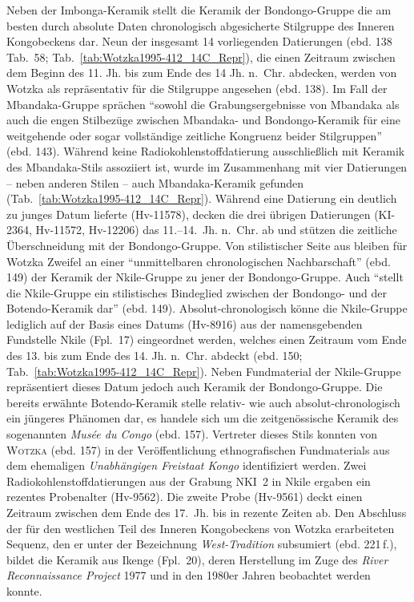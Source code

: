 Neben der Imbonga-Keramik stellt die Keramik der Bondongo-Gruppe die am besten durch absolute Daten chronologisch abgesicherte Stilgruppe des Inneren Kongobeckens dar. Neun der insgesamt 14 vorliegenden Datierungen (ebd. 138 Tab.~58; Tab.~\ref{tab:Wotzka1995-412_14C_Repr}), die einen Zeitraum zwischen dem Beginn des 11. Jh. bis zum Ende des 14 Jh. n.~Chr. abdecken, werden von Wotzka als repräsentativ für die Stilgruppe angesehen (ebd. 138). Im Fall der Mbandaka-Gruppe sprächen \enquote{sowohl die Grabungsergebnisse von Mbandaka als auch die engen Stilbezüge zwischen Mbandaka- und Bondongo-Keramik für eine weitgehende oder sogar vollständige zeitliche Kongruenz beider Stilgruppen} (ebd. 143). Während keine Radiokohlenstoffdatierung ausschließlich mit Keramik des Mbandaka-Stils assoziiert ist, wurde im Zusammenhang mit vier Datierungen -- neben anderen Stilen -- auch Mbandaka-Keramik gefunden (Tab.~\ref{tab:Wotzka1995-412_14C_Repr}). Während eine Datierung ein deutlich zu junges Datum lieferte (Hv-11578), decken die drei übrigen Datierungen (KI-2364, Hv-11572, Hv-12206) das 11.--14.~Jh. n.~Chr. ab und stützen die zeitliche Überschneidung mit der Bondongo-Gruppe. Von stilistischer Seite aus bleiben für Wotzka Zweifel an einer \enquote{unmittelbaren chronologischen Nachbarschaft} (ebd. 149) der Keramik der Nkile-Gruppe zu jener der Bondongo-Gruppe. Auch \enquote{stellt die Nkile-Gruppe ein stilistisches Bindeglied zwischen der Bondongo- und der Botendo-Keramik dar} (ebd. 149). Absolut-chronologisch könne die Nkile-Gruppe lediglich auf der Basis eines Datums (Hv-8916) aus der namensgebenden Fundstelle Nkile (Fpl.~17) eingeordnet werden, welches einen Zeitraum vom Ende des 13. bis zum Ende des 14. Jh. n.~Chr. abdeckt (ebd. 150; Tab.~\ref{tab:Wotzka1995-412_14C_Repr}). Neben Fundmaterial der Nkile-Gruppe repräsentiert dieses Datum jedoch auch Keramik der Bondongo-Gruppe. Die bereits erwähnte Botendo-Keramik stelle relativ- wie auch absolut-chronologisch ein jüngeres Phänomen dar, es handele sich um die zeitgenössische Keramik des sogenannten \textit{Musée du Congo} (ebd. 157). Vertreter dieses Stils konnten von \textsc{Wotzka} (ebd. 157) in der Veröffentlichung ethnografischen Fundmaterials aus dem ehemaligen \textit{Unabhängigen Freistaat Kongo} \parencite[155--157 Taf.~12]{Coart.1907} identifiziert werden. Zwei Radiokohlenstoffdatierungen aus der Grabung NKI~2 in Nkile \parencite[Fpl.~17; ][158 Tab.~70, 318--322 Kat.-Nr.~13; Tab.~\ref{tab:Wotzka1995-412_14C_Repr}]{Wotzka.1995} ergaben ein rezentes Probenalter (Hv-9562). Die zweite Probe (Hv-9561) deckt einen Zeitraum zwischen dem Ende des 17.~Jh. bis in rezente Zeiten ab. Den Abschluss der für den westlichen Teil des Inneren Kongobeckens von Wotzka erarbeiteten Sequenz, den er unter der Bezeichnung \textit{West-Tradition} subsumiert (ebd. 221\,f.), bildet die Keramik aus Ikenge (Fpl.~20), deren Herstellung im Zuge des \textit{River Reconnaissance Project} 1977 \parencite{Eggert.1980c} und in den 1980er Jahren beobachtet werden konnte.

